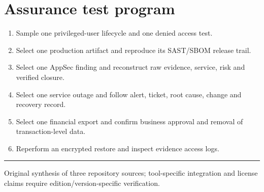 \documentclass[10pt,letterpaper]{article}
\begin{document}
\section{Assurance test program}
\begin{enumerate}
\item Sample one privileged-user lifecycle and one denied access test.
\item Select one production artifact and reproduce its SAST/SBOM release trail.
\item Select one AppSec finding and reconstruct raw evidence, service, risk and verified closure.
\item Select one service outage and follow alert, ticket, root cause, change and recovery record.
\item Select one financial export and confirm business approval and removal of transaction-level data.
\item Reperform an encrypted restore and inspect evidence access logs.
\end{enumerate}
\vfill\noindent\color{muted}\rule{\linewidth}{0.4pt}\par\scriptsize Original synthesis of three repository sources; tool-specific integration and license claims require edition/version-specific verification.\normalsize
\end{document}

